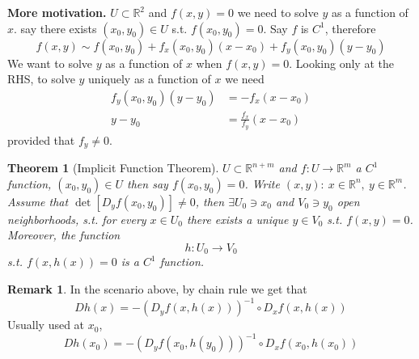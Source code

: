 \documentclass[11pt,a4paper]{article}
\theoremstyle{definition}
\newtheorem{remark}[definition]{Remark}
\theoremstyle{plain}
\newtheorem{theorem}[definition]{Theorem}
\theoremstyle{remark}
\newcommand{\R}{\mathbb{R}}
\begin{document}
\textbf{More motivation.} $U \subset \R^{2}$ and $f(x,y) = 0$ we need to solve $y$ as a function of $x$. 
say there exists $(x_0, y_0) \in U$ s.t. $f(x_0, y_0) = 0$. Say $f$ is $C^1$, therefore 
$$f(x,y) \sim f(x_0, y_0) + f_x(x_0, y_0) (x-x_0) + f_y(x_0, y_0) (y-y_0)$$
We want to solve $y$ as a function of $x$ when $f(x,y) = 0$. 
Looking only at the RHS, to solve $y$ uniquely as a function of $x$ we need 
\begin{align*}
    f_y(x_0, y_0) (y-y_0) &= - f_x (x-x_0) \\
    y-y_0 &= \frac{f_x}{f_y} (x-x_0)
\end{align*}
provided that $f_y \ne 0$. 

\begin{theorem}[Implicit Function Theorem]
    $U \subset \R^{n+m}$ and $f \colon U \to \R^m$ a $C^1$ function, $(x_0, y_0) \in U$ then say 
    $f(x_0, y_0) = 0$. Write $(x,y) \colon \ x \in \R^n, \ y \in \R^m$. Assume that 
    $\det [D_yf(x_0, y_0)] \ne 0$, then $\exists U_0 \ni x_0 $ and $V_0 \ni y_0$ open neighborhoods, s.t. 
    for every $x \in U_0$ there exists a unique $y \in V_0$ s.t. $f(x,y) = 0$. Moreover, the function 
    $$h \colon U_0 \to V_0$$
    s.t. $f(x, h(x)) = 0$ is a $C^1$ function.  
\end{theorem}

\begin{remark}
    In the scenario above, by chain rule we get that 
    $$Dh(x) = -(D_yf(x,h(x)))^{-1} \circ D_xf(x,h(x))$$
    Usually used at $x_0$, 
    $$Dh(x_0) = -(D_yf(x_0,h(y_0)))^{-1} \circ D_xf(x_0,h(x_0))$$
\end{remark}
\end{document}
